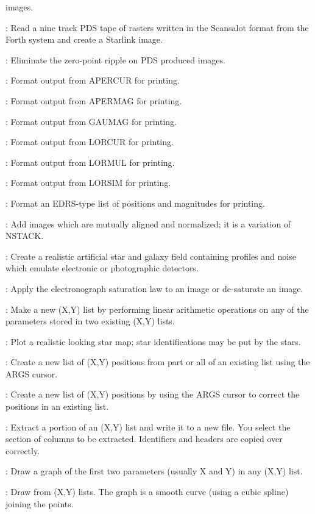 \begin{description}
images.
\item [PDSRASTER]: Read a nine track PDS tape of rasters written in the
Scansalot format from the Forth system and create a Starlink image.
\item [PDSRIPPLE]: Eliminate the zero-point ripple on PDS produced images.
\item [PRAPERCUR]: Format output from APERCUR for printing.
\item [PRAPERMAG]: Format output from APERMAG for printing.
\item [PRGAUMAG]: Format output from GAUMAG for printing.
\item [PRLORCUR]: Format output from LORCUR for printing.
\item [PRLORMUL]: Format output from LORMUL for printing.
\item [PRLORSIM]: Format output from LORSIM for printing.
\item [PRMAGS]: Format an EDRS-type list of positions and magnitudes for
printing.
\item [PSTACK]: Add images which are mutually aligned and normalized; it is a
variation of NSTACK.
\item [PUTSTAR]: Create a realistic artificial star and galaxy field containing
profiles and noise which emulate electronic or photographic detectors.
\item [SATCOR]: Apply the electronograph saturation law to an image or
de-saturate an image.
\item [XYARITH]: Make a new (X,Y) list by performing linear arithmetic
operations on any of the parameters stored in two existing (X,Y) lists.
\item [XYCHART]: Plot a realistic looking star map; star identifications may be
put by the stars.
\item [XYCURA]: Create a new list of (X,Y) positions from part or all of an
existing list using the ARGS cursor.
\item [XYCURB]: Create a new list of (X,Y) positions by using the ARGS cursor to
correct the positions in an existing list.
\item [XYCUT]: Extract a portion of an (X,Y) list and write it to a new file.
You select the section of columns to be extracted.
Identifiers and headers are copied over correctly.
\item [XYDRAW]: Draw a graph of the first two parameters (usually X and Y) in
any (X,Y) list.
\item [XYDRAWA]: Draw from (X,Y) lists.
The graph is a smooth curve (using a cubic spline) joining the points.

\end{description}

